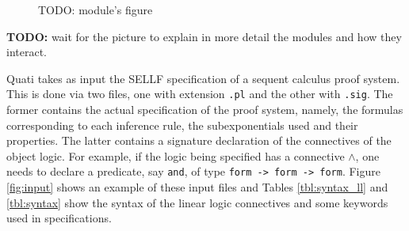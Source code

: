 \documentclass{llncs}
\begin{document}
\begin{figure}
TODO: module's figure
\end{figure}

\textbf{TODO:} wait for the picture to explain in more detail the modules and how they
interact.

Quati takes as input the SELLF specification of a sequent calculus proof system.
This is done via two files, one with extension \texttt{.pl} and the other with
\texttt{.sig}. The former contains the actual specification of the proof system,
namely, the formulas corresponding to each inference rule, the subexponentials
used and their properties. The latter contains a signature declaration of the
connectives of the object logic. For example, if the logic being specified has a
connective $\wedge$, one needs to declare a predicate, say \texttt{and}, of type
\texttt{form -> form -> form}. Figure \ref{fig:input} shows an example of these
input files and Tables \ref{tbl:syntax_ll} and \ref{tbl:syntax} show the syntax of the
linear logic connectives and some keywords used in specifications.
\end{document}
